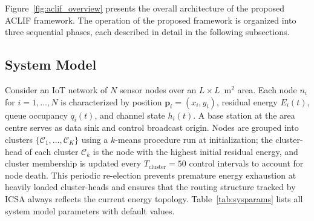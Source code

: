 \documentclass[a4paper]{cas-dc}
\numberwithin{equation}{section}
\begin{document}
Figure~\ref{fig:aclif_overview} presents the overall architecture of the proposed ACLIF framework. The operation of the proposed framework is organized into three sequential phases, each described in detail in the following subsections.

\subsection{System Model}
\label{subsec:sysmodel}

Consider an IoT network of $N$ sensor nodes over an $L \times L$~m$^2$ area. Each node $n_i$ for $i=1,\ldots,N$ is characterized by position $\mathbf{p}_i=(x_i,y_i)$, residual energy $E_i(t)$, queue occupancy $q_i(t)$, and channel state $h_i(t)$. A base station at the area centre serves as data sink and control broadcast origin. Nodes are grouped into clusters $\{\mathcal{C}_1,\ldots,\mathcal{C}_K\}$ using a $k$-means procedure run at initialization; the cluster-head of each cluster $\mathcal{C}_k$ is the node with the highest initial residual energy, and cluster membership is updated every $T_{\text{cluster}}=50$ control intervals to account for node death. This periodic re-election prevents premature energy exhaustion at heavily loaded cluster-heads and ensures that the routing structure tracked by ICSA always reflects the current energy topology. Table~\ref{tab:sysparams} lists all system model parameters with default values.
\end{document}
